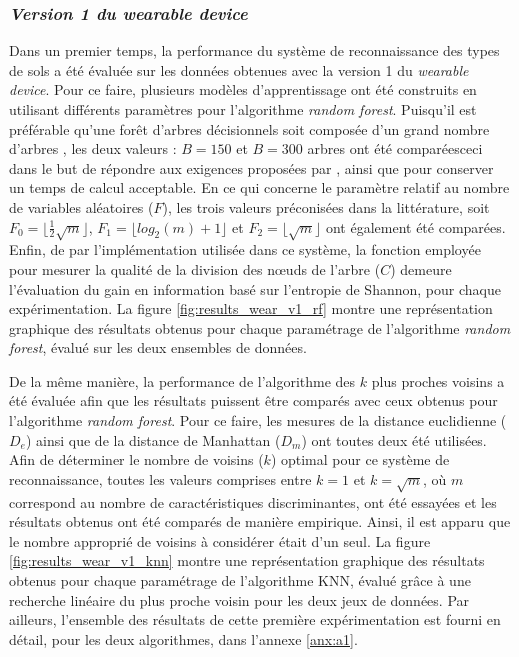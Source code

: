\subsubsection{\textit{Version 1 du wearable device}}

Dans un premier temps, la performance du système de reconnaissance des types de sols a été évaluée sur les données obtenues avec la version 1 du \textit{wearable device}. Pour ce faire, plusieurs modèles d'apprentissage ont été construits en utilisant différents paramètres pour l'algorithme \textit{random forest}. Puisqu'il est préférable qu'une forêt d'arbres décisionnels soit composée d'un grand nombre d'arbres \citep{Breiman2001}, les deux valeurs : $B=150$ et $B=300$ arbres ont été comparées\textemdash ceci dans le but de répondre aux exigences proposées par \cite{Breiman2001}, ainsi que pour conserver un temps de calcul acceptable. En ce qui concerne le paramètre relatif au nombre de variables aléatoires ($F$), les trois valeurs préconisées dans la littérature, soit $F_0=\lfloor \frac{1}{2}\sqrt{m}\rfloor$, $F_1=\lfloor log_2(m) + 1\rfloor$ et $F_2=\lfloor \sqrt{m}\rfloor$ ont également été comparées. Enfin, de par l'implémentation utilisée dans ce système, la fonction employée pour mesurer la qualité de la division des n\oe{}uds de l'arbre ($C$) demeure l'évaluation du gain en information basé sur l'entropie de Shannon, pour chaque expérimentation. La figure \ref{fig:results_wear_v1_rf} montre une représentation graphique des résultats obtenus pour chaque paramétrage de l'algorithme \textit{random forest}, évalué sur les deux ensembles de données.

De la même manière, la performance de l'algorithme des $k$ plus proches voisins a été évaluée afin que les résultats puissent être comparés avec ceux obtenus pour l'algorithme \textit{random forest}. Pour ce faire, les mesures de la distance euclidienne ($D_e$) ainsi que de la distance de Manhattan ($D_m$) ont toutes deux été utilisées. Afin de déterminer le nombre de voisins ($k$) optimal pour ce système de reconnaissance, toutes les valeurs comprises entre $k=1$ et $k=\sqrt{m}$, où $m$ correspond au nombre de caractéristiques discriminantes, ont été essayées et les résultats obtenus ont été comparés de manière empirique. Ainsi, il est apparu que le nombre approprié de voisins à considérer était d'un seul. La figure \ref{fig:results_wear_v1_knn} montre une représentation graphique des résultats obtenus pour chaque paramétrage de l'algorithme \acs{KNN}, évalué grâce à une recherche linéaire du plus proche voisin pour les deux jeux de données. Par ailleurs, l'ensemble des résultats de cette première expérimentation est fourni en détail, pour les deux algorithmes, dans l'annexe \ref{anx:a1}.

